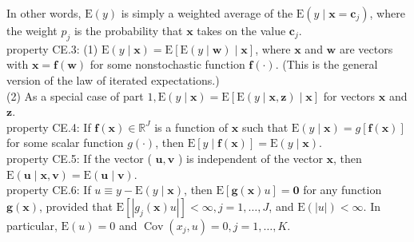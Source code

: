 \documentclass[10pt]{article}
\begin{document}
In other words, $\mathrm{E}(y)$ is simply a weighted average of the $\mathrm{E}\left(y \mid \mathbf{x}=\mathbf{c}_{j}\right)$, where the weight $p_{j}$ is the probability that $\mathbf{x}$ takes on the value $\mathbf{c}_{j}$.\\
property CE.3: (1) $\mathrm{E}(y \mid \mathbf{x})=\mathrm{E}[\mathrm{E}(y \mid \mathbf{w}) \mid \mathbf{x}]$, where $\mathbf{x}$ and $\mathbf{w}$ are vectors with $\mathbf{x}= \mathbf{f}(\mathbf{w})$ for some nonstochastic function $\mathbf{f}(\cdot)$. (This is the general version of the law of iterated expectations.)\\
(2) As a special case of part $1, \mathrm{E}(y \mid \mathbf{x})=\mathrm{E}[\mathrm{E}(y \mid \mathbf{x}, \mathbf{z}) \mid \mathbf{x}]$ for vectors $\mathbf{x}$ and $\mathbf{z}$.\\
property CE.4: If $\mathbf{f}(\mathbf{x}) \in \mathbb{R}^{J}$ is a function of $\mathbf{x}$ such that $\mathrm{E}(y \mid \mathbf{x})=g[\mathbf{f}(\mathbf{x})]$ for some scalar function $g(\cdot)$, then $\mathrm{E}[y \mid \mathbf{f}(\mathbf{x})]=\mathrm{E}(y \mid \mathbf{x})$.\\
property CE.5: If the vector ( $\mathbf{u}, \mathbf{v}$ ) is independent of the vector $\mathbf{x}$, then $\mathrm{E}(\mathbf{u} \mid \mathbf{x}, \mathbf{v})= \mathrm{E}(\mathbf{u} \mid \mathbf{v})$.\\
property CE.6: If $u \equiv y-\mathrm{E}(y \mid \mathbf{x})$, then $\mathrm{E}[\mathbf{g}(\mathbf{x}) u]=\mathbf{0}$ for any function $\mathbf{g}(\mathbf{x})$, provided that $\mathrm{E}\left[\left|g_{j}(\mathbf{x}) u\right|\right]<\infty, j=1, \ldots, J$, and $\mathrm{E}(|u|)<\infty$. In particular, $\mathrm{E}(u)=0$ and $\operatorname{Cov}\left(x_{j}, u\right)=0, j=1, \ldots, K$.
\end{document}
